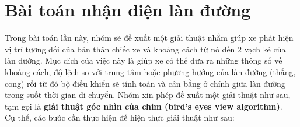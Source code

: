 \section{Bài toán nhận diện làn đường}
Trong bài toán lần này, nhóm sẽ đề xuất một giải thuật nhằm giúp xe phát hiện vị trí tương đối của bản thân chiếc xe và khoảng cách từ nó đến 2 vạch kẻ của làn đường. Mục đích của việc này là giúp xe có thể đưa ra những thông số về khoảng cách, độ lệch so với trung tâm hoặc phương hướng của làn đường (thẳng, cong) rồi từ đó bộ điều khiển sẽ tính toán và cân bằng ở chính giữa làn đường trong suốt thời gian di chuyển. Nhóm xin phép đề xuất một giải thuật như sau, tạm gọi là \textbf{giải thuật góc nhìn của chim (bird's eyes view algorithm)}. \\
\newline
Cụ thể, các bước cần thực hiện để hiện thực giải thuật như sau:
